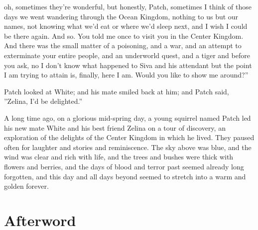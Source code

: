 \documentclass[12pt]{book}
\begin{document}
 oh, sometimes they're wonderful, but honestly, Patch, sometimes I think of those days we went wandering through the Ocean Kingdom, nothing to us but our names, not knowing what we'd eat or where we'd sleep next, and I wish I could be there again. And so. You told me once to visit you in the Center Kingdom. And there was the small matter of a poisoning, and a war, and an attempt to exterminate your entire people, and an underworld quest, and a tiger %
 and before you ask, no I don't know what happened to Siva and his attendant %
 but the point I am trying to attain is, finally, here I am. Would you like to show me around?''\par
 Patch looked at White; and his mate smiled back at him; and Patch said, ''Zelina, I'd be delighted.''\par
 A long time ago, on a glorious mid-spring day, a young squirrel named Patch led his new mate White and his best friend Zelina on a tour of discovery, an exploration of the delights of the Center Kingdom in which he lived. They paused often for laughter and stories and reminiscence. The sky above was blue, and the wind was clear and rich with life, and the trees and bushes were thick with flowers and berries, and the days of blood and terror past seemed already long forgotten, and this day and all days beyond seemed to stretch into a warm and golden forever. \par

\section{Afterword}
\end{document}
